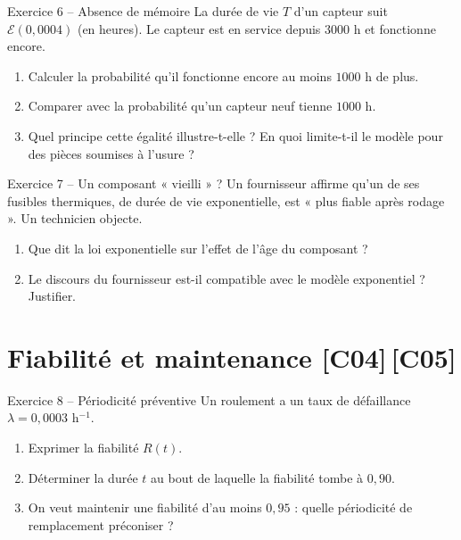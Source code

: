 \documentclass[a4paper,11pt]{article}
\begin{document}
\begin{exo}{Exercice 6 -- Absence de mémoire}
La durée de vie $T$ d'un capteur suit $\mathcal{E}(0{,}0004)$ (en heures). Le capteur est en service depuis $3000$ h et fonctionne encore.
\begin{enumerate}[label=\alph*)]
  \item Calculer la probabilité qu'il fonctionne encore au moins $1000$ h de plus.
  \item Comparer avec la probabilité qu'un capteur neuf tienne $1000$ h.
  \item Quel principe cette égalité illustre-t-elle ? En quoi limite-t-il le modèle pour des pièces soumises à l'usure ?
\end{enumerate}
\end{exo}

\begin{exo}{Exercice 7 -- Un composant « vieilli » ?}
Un fournisseur affirme qu'un de ses fusibles thermiques, de durée de vie exponentielle, est « plus fiable après rodage ». Un technicien objecte.
\begin{enumerate}[label=\alph*)]
  \item Que dit la loi exponentielle sur l'effet de l'âge du composant ?
  \item Le discours du fournisseur est-il compatible avec le modèle exponentiel ? Justifier.
\end{enumerate}
\end{exo}

\section{Fiabilité et maintenance \hfill {\normalsize\color{uimmred}[C04]\,[C05]}}

\begin{exo}{Exercice 8 -- Périodicité préventive}
Un roulement a un taux de défaillance $\lambda = 0{,}0003$ h$^{-1}$.
\begin{enumerate}[label=\alph*)]
  \item Exprimer la fiabilité $R(t)$.
  \item Déterminer la durée $t$ au bout de laquelle la fiabilité tombe à $0{,}90$.
  \item On veut maintenir une fiabilité d'au moins $0{,}95$ : quelle périodicité de remplacement préconiser ?
\end{enumerate}
\end{exo}
\end{document}
